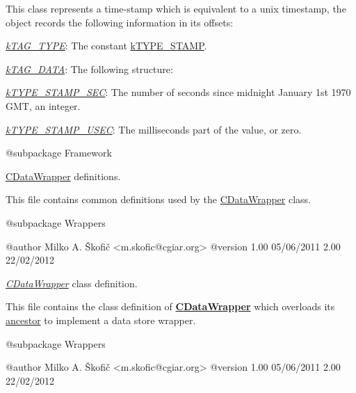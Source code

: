 This class represents a time-\/stamp which is equivalent to a unix timestamp, the object records the following information in its offsets\-:


\begin{DoxyItemize}
\item {\itshape \hyperlink{}{k\-T\-A\-G\-\_\-\-T\-Y\-P\-E}}\-: The constant \hyperlink{}{k\-T\-Y\-P\-E\-\_\-\-S\-T\-A\-M\-P}. 
\item {\itshape \hyperlink{}{k\-T\-A\-G\-\_\-\-D\-A\-T\-A}}\-: The following structure\-: 
\begin{DoxyItemize}
\item {\itshape \hyperlink{}{k\-T\-Y\-P\-E\-\_\-\-S\-T\-A\-M\-P\-\_\-\-S\-E\-C}}\-: The number of seconds since midnight January 1st 1970 G\-M\-T, an integer. 
\item {\itshape \hyperlink{}{k\-T\-Y\-P\-E\-\_\-\-S\-T\-A\-M\-P\-\_\-\-U\-S\-E\-C}}\-: The milliseconds part of the value, or zero. 
\end{DoxyItemize}
\end{DoxyItemize}

\begin{DoxyVerb}    @subpackage     Framework\end{DoxyVerb}


\hyperlink{class_c_data_wrapper}{C\-Data\-Wrapper} definitions.

This file contains common definitions used by the \hyperlink{class_c_data_wrapper}{C\-Data\-Wrapper} class.

\begin{DoxyVerb}    @subpackage     Wrappers

    @author         Milko A. Škofič <m.skofic@cgiar.org>
    @version        1.00 05/06/2011
                            2.00 22/02/2012\end{DoxyVerb}


{\itshape \hyperlink{class_c_data_wrapper}{C\-Data\-Wrapper}} class definition.

This file contains the class definition of {\bfseries \hyperlink{class_c_data_wrapper}{C\-Data\-Wrapper}} which overloads its \hyperlink{class_c_wrapper}{ancestor} to implement a data store wrapper.

\begin{DoxyVerb}    @subpackage     Wrappers

    @author         Milko A. Škofič <m.skofic@cgiar.org>
    @version        1.00 05/06/2011
                            2.00 22/02/2012\end{DoxyVerb}


